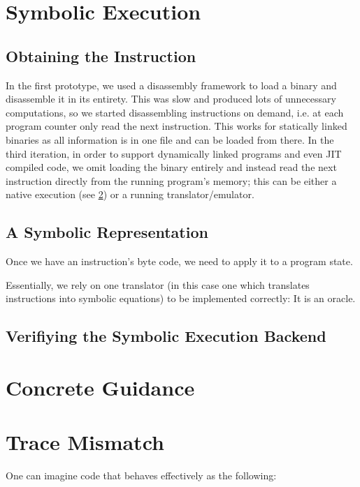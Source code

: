 \section{Symbolic Execution}

\subsection{Obtaining the Instruction}

In the first prototype, we used a disassembly framework to load a binary and disassemble it in its entirety. This was
slow and produced lots of unnecessary computations, so we started disassembling instructions on demand, i.e. at each
program counter only read the next instruction. This works for statically linked binaries as all information is in one
file and can be loaded from there. In the third iteration, in order to support dynamically linked programs and even
\ac{JIT} compiled code, we omit loading the binary entirely and instead read the next instruction directly from the
running program's memory; this can be either a native execution (see \ref{sec:impl:concrete_exec}) or a running
translator/emulator.

\subsection{A Symbolic Representation}

Once we have an instruction's byte code, we need to apply it to a program state.

Essentially, we rely on one translator (in this case one which translates instructions into symbolic equations) to be
implemented correctly: It is an oracle.

\subsection{Verifiying the Symbolic Execution Backend}

\section{Concrete Guidance}\label{sec:impl:concrete_exec}

\section{Trace Mismatch}\label{sec:impl:trace_mismatch}

One can imagine code that behaves effectively as the following:

